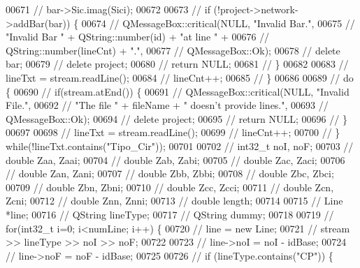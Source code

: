 \begin{DoxyCode}
00671 \textcolor{comment}{//    bar->Sic.imag(Sici);}
00672 
00673 \textcolor{comment}{//    if (!project->network->addBar(bar)) \{}
00674 \textcolor{comment}{//      QMessageBox::critical(NULL, "Invalid Bar.",}
00675 \textcolor{comment}{//                            "Invalid Bar " + QString::number(id) + "at line " +}
00676 \textcolor{comment}{//                            QString::number(lineCnt) + ".",}
00677 \textcolor{comment}{//                            QMessageBox::Ok);}
00678 \textcolor{comment}{//      delete bar;}
00679 \textcolor{comment}{//      delete project;}
00680 \textcolor{comment}{//      return NULL;}
00681 \textcolor{comment}{//    \}}
00682 
00683 \textcolor{comment}{//    lineTxt = stream.readLine();}
00684 \textcolor{comment}{//    lineCnt++;}
00685 \textcolor{comment}{//  \}}
00686 
00689 \textcolor{comment}{//  do \{}
00690 \textcolor{comment}{//    if(stream.atEnd()) \{}
00691 \textcolor{comment}{//      QMessageBox::critical(NULL, "Invalid File.",}
00692 \textcolor{comment}{//                            "The file " + fileName + " doesn't provide lines.",}
00693 \textcolor{comment}{//                            QMessageBox::Ok);}
00694 \textcolor{comment}{//      delete project;}
00695 \textcolor{comment}{//      return NULL;}
00696 \textcolor{comment}{//    \}}
00697 
00698 \textcolor{comment}{//    lineTxt = stream.readLine();}
00699 \textcolor{comment}{//    lineCnt++;}
00700 \textcolor{comment}{//  \} while(!lineTxt.contains("Tipo\_Cir"));}
00701 
00702 \textcolor{comment}{//  int32\_t noI, noF;}
00703 \textcolor{comment}{//  double Zaa, Zaai;}
00704 \textcolor{comment}{//  double Zab, Zabi;}
00705 \textcolor{comment}{//  double Zac, Zaci;}
00706 \textcolor{comment}{//  double Zan, Zani;}
00707 \textcolor{comment}{//  double Zbb, Zbbi;}
00708 \textcolor{comment}{//  double Zbc, Zbci;}
00709 \textcolor{comment}{//  double Zbn, Zbni;}
00710 \textcolor{comment}{//  double Zcc, Zcci;}
00711 \textcolor{comment}{//  double Zcn, Zcni;}
00712 \textcolor{comment}{//  double Znn, Znni;}
00713 \textcolor{comment}{//  double length;}
00714 
00715 \textcolor{comment}{//  Line *line;}
00716 \textcolor{comment}{//  QString lineType;}
00717 \textcolor{comment}{//  QString dummy;}
00718 
00719 \textcolor{comment}{//  for(int32\_t i=0; i<numLine; i++) \{}
00720 \textcolor{comment}{//    line = new Line;}
00721 \textcolor{comment}{//    stream >> lineType >> noI >> noF;}
00722 
00723 \textcolor{comment}{//    line->noI = noI - idBase;}
00724 \textcolor{comment}{//    line->noF = noF - idBase;}
00725 
00726 \textcolor{comment}{//    if (lineType.contains("CP")) \{}

\end{DoxyCode}
